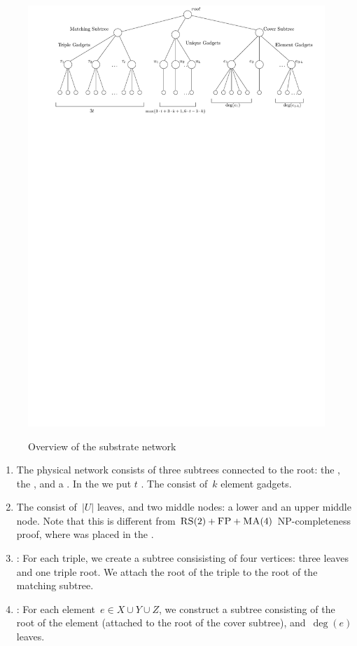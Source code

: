 \begin{figure}[t]
  \centering
  \includegraphics[width=0.99\columnwidth]{figs/static-mapping/overview2}
  \label{fig:red-cc}
  \vspace{-1em}
  \caption{Overview of the substrate network}
  \vspace{-1em}
\end{figure}

\begin{enumerate}
  \item The physical network consists of three subtrees connected to
  the root: the {\MatchSubtree}, the {\CoverSubtree}, and a
  {\UnqSubtree}. In the {\MatchSubtree} we put $t$
  {\TripleGadgets}. The {\CoverSubtree} consist of~$k$ element gadgets.
  \item The {\UnqSubtree} consist of~$|U|$ leaves, and two middle nodes:
  a lower and an upper middle node. Note that this is different from $\textsc{RS}(2)+\textsc{FP}+\textsc{MA}(4)$ NP-completeness proof, where {\UnqSubtree} was placed in the {\MatchSubtree}.
  \item \TripleGadget: For each triple, we create a subtree
  consisisting of four vertices: three leaves and one triple root.  We
  attach the root of the triple to the root of the matching subtree.
  \item \ElGadget: For each element~$e \in X\cup Y\cup Z$, we
  construct a subtree consisting of the root of the element (attached
  to the root of the cover subtree), and~$\deg(e)$ leaves.
\end{enumerate}

